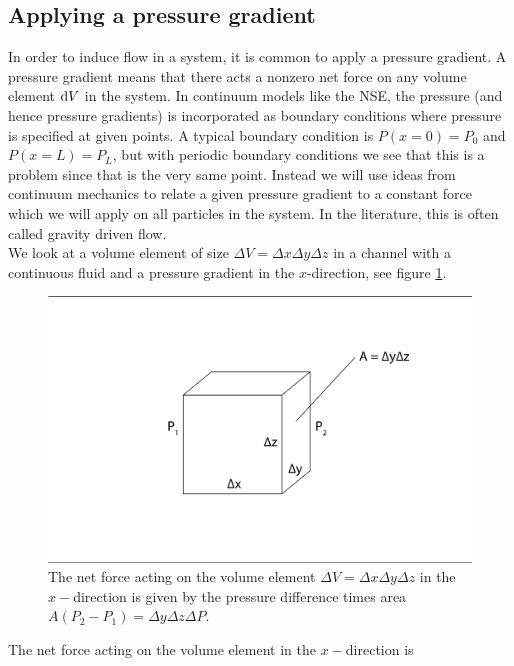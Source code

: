\subsection{Applying a pressure gradient}
In order to induce flow in a system, it is common to apply a pressure gradient. A pressure gradient means that there acts a nonzero net force on any volume element $\mathrm{d}V$ in the system. In continuum models like the NSE, the pressure (and hence pressure gradients) is incorporated as boundary conditions where pressure is specified at given points. A typical boundary condition is $P(x=0) = P_0$ and $P(x=L) = P_L$, but with periodic boundary conditions we see that this is a problem since that is the very same point. Instead we will use ideas from continuum mechanics to relate a given pressure gradient to a constant force which we will apply on all particles in the system. In the literature, this is often called gravity driven flow.\\
We look at a volume element of size $\Delta V = \Delta x\Delta y\Delta z$ in a channel with a continuous fluid and a pressure gradient in the $x$-direction, see figure \ref{fig:pressure_gravity_equivalent}. 
\begin{figure}[h]
\begin{center}
\includegraphics[width=\textwidth, trim=0cm 0cm 0cm 0cm, clip]{DSMC/figures/pressure_to_gravity.eps}
\end{center}
\caption{The net force acting on the volume element $\Delta V = \Delta x\Delta y\Delta z$ in the $x-$direction is given by the pressure difference times area $A(P_2 - P_1) = \Delta y\Delta z\Delta P$.}
\label{fig:pressure_gravity_equivalent}
\end{figure}
The net force acting on the volume element in the $x-$direction is
